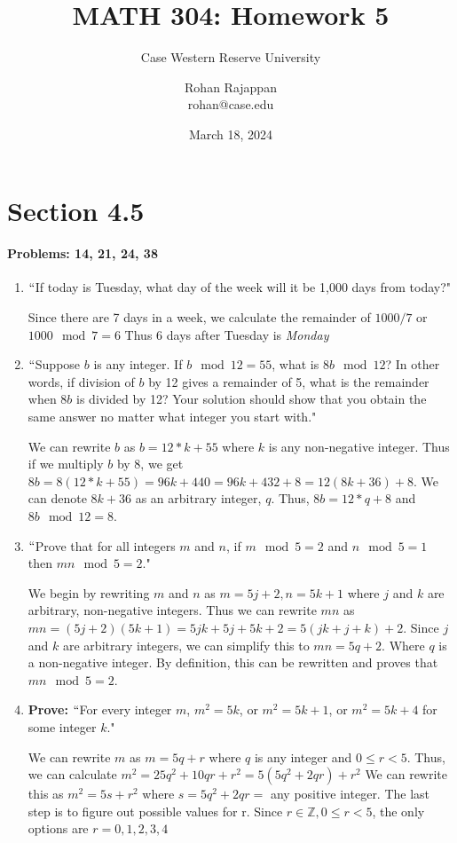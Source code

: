 \documentclass{article}
\title{MATH 304: Homework 5}
\subtitle{Case Western Reserve University}
\author{Rohan Rajappan \\rohan@case.edu}
\date{March 18, 2024}
\makeatletter
\newcommand\setItemnumber[1]{\setcounter{enum\romannumeral\@enumdepth}{\numexpr#1-1\relax}}
\makeatother
\begin{document}
\maketitle

\section{Section 4.5}
 \paragraph{Problems: 14, 21, 24, 38}
 \begin{enumerate}
     \setItemnumber{14}
     \item $``$If today is Tuesday, what day of the week will it be 1,000 days from today?"

     Since there are 7 days in a week, we calculate the remainder of $1000/7$ or $1000\mod{7} = 6$ Thus 6 days after Tuesday is \textit{Monday}
     \setItemnumber{21}
     \item $``$Suppose $b$ is any integer. If $b \mod{12} = 55$, what is $8b \mod{12}$? In other words, if division of $b$ by 12 gives a remainder of 5, what is the remainder when $8b$ is divided by 12? Your solution should show that you obtain the same answer no matter what integer you start with."

     We can rewrite $b$ as $b = 12*k + 55$ where $k$ is any non-negative integer. Thus if we multiply $b$ by 8, we get $8b = 8(12*k + 55) = 96k + 440 = 96k+432+8 = 12(8k+36)+8$. We can denote $8k+36$ as an arbitrary integer, $q$. Thus, $8b = 12*q + 8$ and $8b\mod{12} = 8$.

     \setItemnumber{24}
     \item $``$Prove that for all integers $m$ and $n$, if $m \mod5 = 2$ and $n \mod{5}=1$ then $mn \mod{5}=2$."

     We begin by rewriting $m$ and $n$ as $m=5j+2, n=5k+1$ where $j$ and $k$ are arbitrary, non-negative integers. 
     Thus we can rewrite $mn$ as $mn=(5j+2)(5k+1) = 5jk+5j+5k+2 = 5(jk+j+k) + 2$. Since $j$ and $k$ are arbitrary integers, we can simplify this to $mn=5q+2$. Where $q$ is a non-negative integer. By definition, this can be rewritten and proves that $mn\mod{5}=2$.

     \setItemnumber{38}
     \item \textbf{Prove:} $``$For every integer $m$, $m^2=5k$, or $m^2=5k+1$, or $m^2=5k+4$ for some integer $k$."

     We can rewrite $m$ as $m=5q+r$ where $q$ is any integer and $0\leq r<5$. Thus, we can calculate $m^2 = 25q^2+10qr+r^2 = 5(5q^2+2qr)+r^2$ We can rewrite this as
     $m^2=5s+r^2$ where $s = 5q^2+2qr = $ any positive integer. The last step is to figure out possible values for r. Since $r\in\mathbb{Z}, 0\leq r<5$,
     the only options are $r=0,1,2,3,4$ 
     

\end{enumerate}
\end{document}
